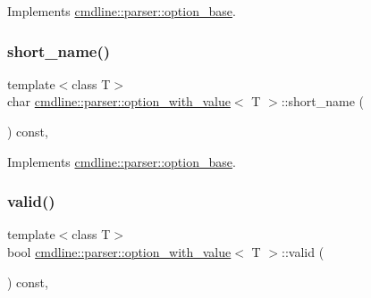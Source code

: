 Implements \mbox{\hyperlink{classcmdline_1_1parser_1_1option__base_a091cab2d9f8e85a8e5e1a1a11e274aff}{cmdline\+::parser\+::option\+\_\+base}}.

\mbox{\label{classcmdline_1_1parser_1_1option__with__value_a2ebacba0864e4473cefc8a4a967f4ab1}} 
\subsubsection{\texorpdfstring{short\_name()}{short\_name()}}
{\footnotesize\ttfamily template$<$class T$>$ \\
char \mbox{\hyperlink{classcmdline_1_1parser_1_1option__with__value}{cmdline\+::parser\+::option\+\_\+with\+\_\+value}}$<$ T $>$\+::short\+\_\+name (\begin{DoxyParamCaption}{ }\end{DoxyParamCaption}) const\hspace{0.3cm}{\ttfamily [inline]}, {\ttfamily [virtual]}}



Implements \mbox{\hyperlink{classcmdline_1_1parser_1_1option__base_aeea790198b8097ccb98a5a9063d3c81f}{cmdline\+::parser\+::option\+\_\+base}}.

\mbox{\label{classcmdline_1_1parser_1_1option__with__value_aae5ed5d511506ab324d203d31abb4a28}} 
\subsubsection{\texorpdfstring{valid()}{valid()}}
{\footnotesize\ttfamily template$<$class T$>$ \\
bool \mbox{\hyperlink{classcmdline_1_1parser_1_1option__with__value}{cmdline\+::parser\+::option\+\_\+with\+\_\+value}}$<$ T $>$\+::valid (\begin{DoxyParamCaption}{ }\end{DoxyParamCaption}) const\hspace{0.3cm}{\ttfamily [inline]}, {\ttfamily [virtual]}}



